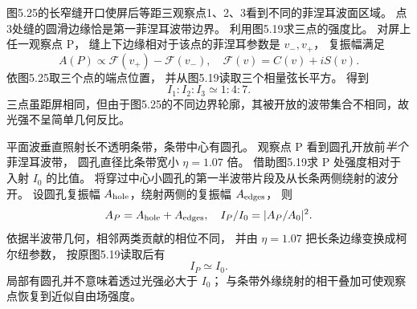 图5.25的长窄缝开口使屏后等距三观察点1、2、3看到不同的菲涅耳波面区域。
点3处缝的圆滑边缘恰是第一菲涅耳波带边界。
利用图5.19求三点的强度比。
\exsolution
对屏上任一观察点 P，
缝上下边缘相对于该点的菲涅耳参数是
$v_-,v_+$，
复振幅满足
\[
A(P)\propto
\mathcal F(v_+)-\mathcal F(v_-),
\quad \mathcal F(v)=C(v)+iS(v).
\]
依图5.25取三个点的端点位置，
并从图5.19读取三个相量弦长平方。
得到
\[
\boxed{I_1:I_2:I_3\simeq1:4:7}.
\]
\excheck 三点虽距屏相同，但由于图5.25的不同边界轮廓，其被开放的波带集合不相同，故光强不呈简单几何反比。

平面波垂直照射长不透明条带，条带中心有圆孔。
观察点 P 看到圆孔开放前\emph{半个}菲涅耳波带，
圆孔直径比条带宽小
$\eta=1.07$ 倍。
借助图5.19求 P 处强度相对于入射 $I_0$ 的比值。
\exsolution
将穿过中心小圆孔的第一半波带片段及从长条两侧绕射的波分开。
设圆孔复振幅 $A_{\rm hole}$，绕射两侧的复振幅
$A_{\rm edges}$，
则
\[
A_P=A_{\rm hole}+A_{\rm edges},
\quad I_P/I_0=|A_P/A_0|^2.
\]
依据半波带几何，相邻两类贡献的相位不同，
并由 $\eta=1.07$ 把长条边缘变换成柯尔纽参数，
按原图5.19读取后有
\[
\boxed{I_P\simeq I_0}.
\]
\excheck 局部有圆孔并不意味着透过光强必大于 $I_0$；
与条带外缘绕射的相干叠加可使观察点恢复到近似自由场强度。

